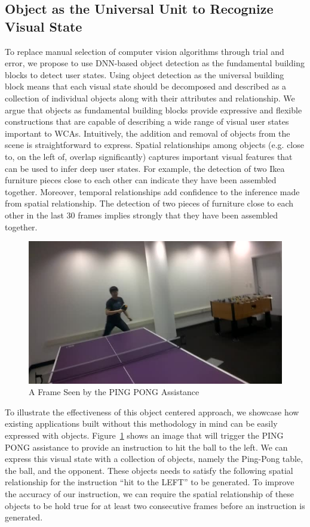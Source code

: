 \subsection{Object as the Universal Unit to Recognize Visual State}

To replace manual selection of computer vision algorithms through trial and
error, we propose to use DNN-based object detection as the fundamental building
blocks to detect user states. Using object detection as the universal building
block means that each visual state should be decomposed and described as a
collection of individual objects along with their attributes and relationship.
We argue that objects as fundamental building blocks provide expressive and
flexible constructions that are capable of describing a wide range of visual
user states important to WCAs. Intuitively, the addition and removal of objects
from the scene is straightforward to express. Spatial relationships among
objects (e.g. close to, on the left of, overlap significantly) captures
important visual features that can be used to infer deep user states. For
example, the detection of two Ikea furniture pieces close to each other can
indicate they have been assembled together. Moreover, temporal relationships add
confidence to the inference made from spatial relationship. The detection of two
pieces of furniture close to each other in the last 30 frames implies strongly
that they have been assembled together.

\begin{figure}
  \centering
  \includegraphics[trim={0 0 0 0},width=\linewidth]{FIGS/pingpong.jpeg}
	\caption{A Frame Seen by the PING PONG Assistance}
    \label{figs:pingpong-frame}
\end{figure}

To illustrate the effectiveness of this object centered approach, we showcase
how existing applications built without this methodology in mind can be easily
expressed with objects. Figure~\ref{figs:pingpong-frame} shows an image that will
trigger the PING PONG assistance to provide an instruction to hit the ball to
the left. We can express this visual state with a collection of objects, namely
the Ping-Pong table, the ball, and the opponent. These objects needs to satisfy
the following spatial relationship for the instruction ``hit to the LEFT'' to be
generated. To improve the accuracy of our instruction, we can require the
spatial relationship of these objects to be hold true for at least two
consecutive frames before an instruction is generated.

